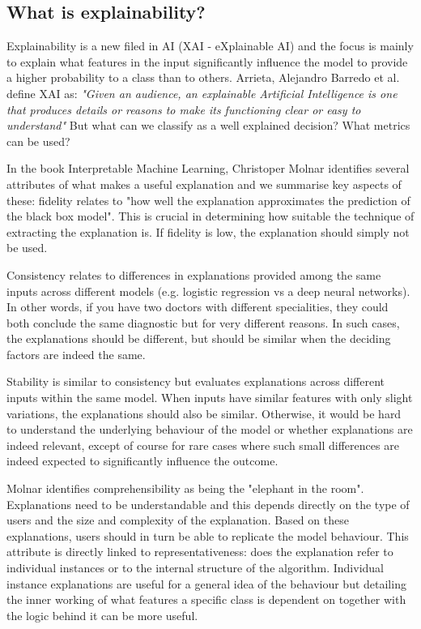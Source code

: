 \documentclass[proposal]{softeng}
\begin{document}
\subsection{What is explainability?}
Explainability is a new filed in AI (XAI - eXplainable AI) and the focus is mainly to explain what features in the input significantly influence the model to provide a higher probability to a class than to others. Arrieta, Alejandro Barredo et al.\cite{BarredoArrietaAlejandro2020EAIX} define XAI as: \textit{"Given an audience, an explainable Artificial Intelligence is one that produces details or reasons to make its functioning clear or easy to understand"}  But what can we classify as a well explained decision? What metrics can be used?

In the book Interpretable Machine Learning, Christoper Molnar \cite{molnar2019} identifies several attributes of what makes a useful explanation and we summarise key aspects of these: fidelity relates to "how well the explanation approximates the prediction of the black box model". This is crucial in determining how suitable the technique of extracting the explanation is. If fidelity is low, the explanation should simply not be used.

Consistency relates to differences in explanations provided among the same inputs across different models (e.g. logistic regression vs a deep neural networks). In other words, if you have two doctors with different specialities, they could both conclude the same diagnostic but for very different reasons. In such cases, the explanations should be different, but should be similar when the deciding factors are indeed the same.

Stability is similar to consistency but evaluates explanations across different inputs within the same model. When inputs have similar features with only slight variations, the explanations should also be similar. Otherwise, it would be hard to understand the underlying behaviour of the model or whether explanations are indeed relevant, except of course for rare cases where such small differences are indeed expected to significantly influence the outcome.

Molnar identifies comprehensibility as being the "elephant in the room". Explanations need to be understandable and this depends directly on the type of users and the size and complexity of the explanation. Based on these explanations, users should in turn be able to replicate the model behaviour. This attribute is directly linked to representativeness: does the explanation refer to individual instances or to the internal structure of the algorithm. Individual instance explanations are useful for a general idea of the behaviour but detailing the inner working of what features a specific class is dependent on together with the logic behind it can be more useful.
\end{document}
